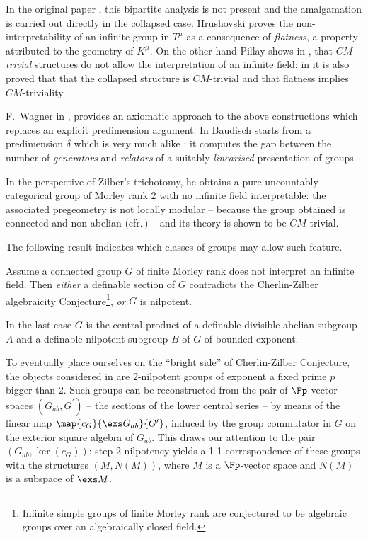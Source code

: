 \smallskip
In the original paper \cite{hruabi}, this bipartite analysis is not present and the amalgamation
is carried out directly in the collapsed case. Hrushovski proves the non-interpretability of an infinite group in $T^{\mu}$
as a consequence of {\em flatness}, a property attributed to the geometry of $K^{\mu}$. On the other hand Pillay shows in \cite{pilcm},
that $CM$-{\em trivial} structures do not allow the interpretation of an infinite field:
in \cite{hruabi} it is also proved that that the collapsed structure is $CM$-trivial and that flatness implies $CM$-triviality.

\smallskip
F.{\ }Wagner in \cite{wag}, provides
an axiomatic approach to the above constructions which replaces an explicit predimension argument.
\crule
\bigskip
In \cite{bad} Baudisch starts from a predimension $\delta$ which is very much alike : it computes
the gap between the number of {\em generators} and {\em relators} of a suitably {\em linearised} presentation of groups.

In the perspective of Zilber's trichotomy, he obtains a pure uncountably categorical group of Morley rank $2$ with no infinite field
interpretable: the associated pregeometry is not locally modular -- because the group obtained is connected and non-abelian
(cfr.{\,}\cite{hp}) -- and its theory is shown to be $CM$-trivial.

The following result indicates which classes of groups may allow such feature.
\begin{fact*}
Assume a connected group $G$ of finite Morley rank does not interpret an infinite field. Then {\em either}
a definable section of $G$ contradicts the Cherlin-Zilber algebraicity Conjecture\footnote{
Infinite simple groups of finite Morley rank are conjectured to be algebraic groups over
an algebraically closed field.}, {\em or}
$G$ is nilpotent.

In the last case $G$ is the central product of a definable divisible abelian subgroup $A$
and a definable nilpotent subgroup $B$ of $G$ of bounded exponent.
\end{fact*}

To eventually place ourselves on the ``bright side'' of Cherlin-Zilber Conjecture,
the objects considered in \cite{bad} are $2$-nilpotent groups of exponent a fixed prime $p$ bigger than $2$.
Such groups can be reconstructed from the pair of $\Fp$-vector spaces $(G_{ab},G^{\prime})$ -- the sections
of the lower central series -- by means
of the %
linear map $\map{c_{G}}{\exs G_{ab}%
}{G^{\prime}}$, induced by the group commutator in $G$ on the exterior square algebra of $G_{ab}$.
This draws our attention to the pair $(G_{ab},\ker(c_{G}))$: step-$2$ nilpotency
yields a 1-1 correspondence of these groups with the
structures $(M,N(M))$, where $M$ is a $\Fp$-vector space and $N(M)$ is a subspace of $\exs M$. %

